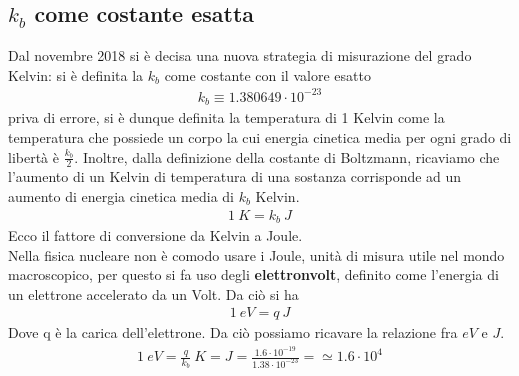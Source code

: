 \documentclass[
10pt, %
a4paper, %
oneside, %
headinclude,footinclude, %
BCOR5mm, %
]{scrartcl}
\begin{document}
\subsection{$k_b$ come costante esatta}
Dal novembre 2018 si è decisa una nuova strategia di misurazione del grado Kelvin: si è definita la $k_b$ come costante con il valore esatto
\begin{align*} 
	k_b \equiv 1.380649 \cdot 10^{-23}
\end{align*} 
priva di errore, si è dunque definita la temperatura di 1 Kelvin come la temperatura che possiede un corpo la cui energia cinetica media per ogni grado di libertà è $\frac{k_b}{2}$. Inoltre, dalla definizione della costante di Boltzmann, ricaviamo che l'aumento di un Kelvin di temperatura di una sostanza corrisponde ad un aumento di energia cinetica media di $k_b$ Kelvin. 
\begin{align*} 
	1\ K = k_b\ J
\end{align*}  
Ecco il fattore di conversione da Kelvin a Joule.\\
Nella fisica nucleare non è comodo usare i Joule, unità di misura utile nel mondo macroscopico, per questo si fa uso degli \textbf{elettronvolt}, definito come l'energia di un elettrone accelerato da un Volt. Da ciò si ha 
\begin{align*} 
	1\ eV = q\ J
\end{align*} 
Dove q è la carica dell'elettrone. Da ciò possiamo ricavare la relazione fra $eV$ e $J$.
\begin{align*} 
	1\ eV = \frac{q}{k_b}\ K = J = \frac{1.6\cdot 10^{-19}}{1.38\cdot10^{-23}}=\simeq 1.6 \cdot 10^4
\end{align*} 
\end{document}
